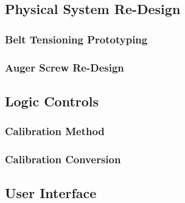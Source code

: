 \subsection{Physical System Re-Design\label{sec:methedology:starveFeeder:physicalSystemReDesign}}

\subsubsection{Belt Tensioning Prototyping\label{sec:methedology:starveFeeder:systemReDesign:beltTensioningPrototyping}}

\subsubsection{Auger Screw Re-Design\label{sec:methedology:starveFeeder:systemReDesign:augerScrewReDesign}}

\subsection{Logic Controls\label{sec:methedology:starveFeeder:logicControls}}

\subsubsection{Calibration Method\label{sec:methedology:starveFeeder:logicControls:calibrationMethod}}

\subsubsection{Calibration Conversion\label{sec:methedology:starveFeeder:logicControls:calibrationConversion}}

\subsection{User Interface\label{sec:methedology:starveFeeder:userInterface}}

